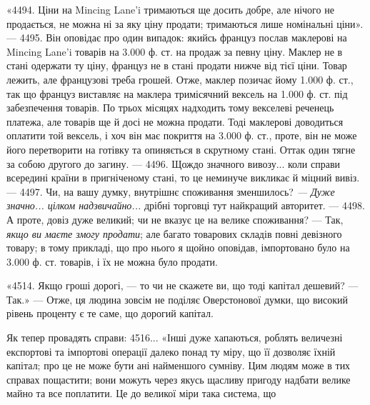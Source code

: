 «4494. Ціни на Mincing Lane’i тримаються ще досить добре, але нічого
не продається, не можна ні за яку ціну продати; тримаються лише номінальні
ціни». — 4495. Він оповідає про один випадок: якийсь француз послав маклерові
на Mincing Lane’i товарів на 3.000 ф. ст. на продаж за певну ціну. Маклер
не в стані одержати ту ціну, француз не в стані продати нижче від тієї
ціни. Товар лежить, але французові треба грошей. Отже, маклер позичає йому 1.000 ф. ст., так що
француз виставляє на маклера тримісячний вексель на 1.000 ф. ст. під забезпечення товарів. По трьох
місяцях надходить тому векселеві
реченець платежа, але товарів ще й досі не можна продати. Тоді маклерові
доводиться оплатити той вексель, і хоч він має покриття на 3.000 ф. ст.,
проте, він не може його перетворити на готівку та опиняється в скрутному
стані. Оттак один тягне за собою другого до загину. — 4496. Щождо значного
вивозу... коли справи всередині країни в пригніченому стані, то це неминуче
викликає й міцний вивіз. — 4497. Чи, на вашу думку, внутрішнє споживання зменшилось?
\emph{— Дуже значно... цілком надзвичайно...} дрібні торговці тут
найкращий авторитет. — 4498. А проте, довіз дуже великий; чи не вказує це
на велике споживання? — Так, \emph{якщо ви маєте змогу продати}; але багато
товарових складів повні девізного товару; в тому прикладі, що про нього я щойно
оповідав, імпортовано було на 3.000 ф. ст. товарів, і їх не можна було продати.

«4514. Якщо гроші дорогі, — то чи не скажете ви, що тоді капітал дешевий?
— Так.» — Отже, ця людина зовсім не поділяє Оверстонової думки, що
високий рівень проценту є те саме, що дорогий капітал.

Як тепер провадять справи: 4516... «Інші дуже хапаються, роблять
величезні експортові та імпортові операції далеко понад ту міру, що її дозволяє
їхній капітал; про це не може бути ані найменшого сумніву. Цим людям
може в тих справах пощастити; вони можуть через якусь щасливу пригоду
надбати велике майно та все поплатити. Це до великої міри така система, що
\parbreak{}  %
